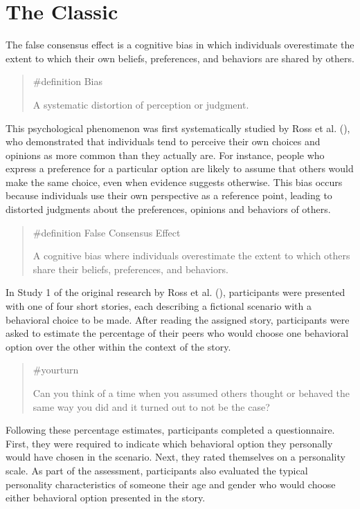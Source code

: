 \documentclass[
  letterpaper,
]{book}
\begin{document}
\section{The Classic}\label{the-classic-19}

The false consensus effect is a cognitive bias in which individuals
overestimate the extent to which their own beliefs, preferences, and
behaviors are shared by others.

\begin{quote}
\label{def-bias}{\#definition} Bias

A systematic distortion of perception or judgment.
\end{quote}

This psychological phenomenon was first systematically studied by Ross
et al. (), who demonstrated that
individuals tend to perceive their own choices and opinions as more
common than they actually are. For instance, people who express a
preference for a particular option are likely to assume that others
would make the same choice, even when evidence suggests otherwise. This
bias occurs because individuals use their own perspective as a reference
point, leading to distorted judgments about the preferences, opinions
and behaviors of others.

\begin{quote}
\label{def-falseconsensus}{\#definition} False Consensus
Effect

A cognitive bias where individuals overestimate the extent to which
others share their beliefs, preferences, and behaviors.
\end{quote}

In Study 1 of the original research by Ross et al.
(), participants were presented with
one of four short stories, each describing a fictional scenario with a
behavioral choice to be made. After reading the assigned story,
participants were asked to estimate the percentage of their peers who
would choose one behavioral option over the other within the context of
the story.

\begin{quote}
{\#yourturn}

Can you think of a time when you assumed others thought or behaved the
same way you did and it turned out to not be the case?
\end{quote}

Following these percentage estimates, participants completed a
questionnaire. First, they were required to indicate which behavioral
option they personally would have chosen in the scenario. Next, they
rated themselves on a personality scale. As part of the assessment,
participants also evaluated the typical personality characteristics of
someone their age and gender who would choose either behavioral option
presented in the story.
\end{document}
